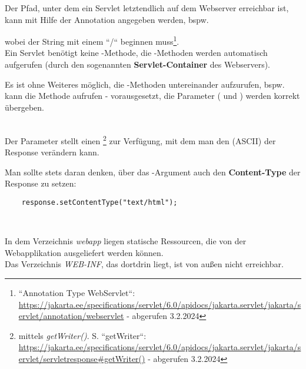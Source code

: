 \noindent
Der Pfad, unter dem ein Servlet letztendlich auf dem Webserver erreichbar ist, kann mit Hilfe der Annotation  angegeben werden, bspw. \begin{center}\end{center} wobei der String mit einem ``/`` beginnen muss\footnote{
    ``Annotation Type WebServlet``: \url{https://jakarta.ee/specifications/servlet/6.0/apidocs/jakarta.servlet/jakarta/servlet/annotation/webservlet} - abgerufen 3.2.2024
}.\\

\noindent
Ein Servlet benötigt keine -Methode, die -Methoden werden automatisch aufgerufen (durch den sogenannten \textbf{Servlet-Container} des Webservers).

\begin{tcolorbox}[enlarge top by=0.5cm,enlarge bottom by=0.5cm]
    Es ist ohne Weiteres möglich, die -Methoden untereinander aufzurufen, bspw. kann  die Methode  aufrufen - vorausgesetzt, die Parameter ( und ) werden korrekt übergeben.
\end{tcolorbox}\\

\noindent
Der Parameter  stellt einen \footnote{
mittels \textit{getWriter()}. S. ``getWriter``: \url{https://jakarta.ee/specifications/servlet/6.0/apidocs/jakarta.servlet/jakarta/servlet/servletresponse#getWriter()} - abgerufen 3.2.2024
} zur Verfügung, mit dem man den  (ASCII) der Response verändern kann.

\begin{tcolorbox}[enlarge top by=0.5cm,enlarge bottom by=0.5cm]
    Man sollte stets daran denken, über das -Argument auch den \textbf{Content-Type} der Response zu setzen:
    \begin{verbatim}
    response.setContentType("text/html");
    \end{verbatim}\\
\end{tcolorbox}

\noindent
In dem Verzeichnis \textit{webapp} liegen statische Ressourcen, die von der Webapplikation ausgeliefert werden können.\\
Das Verzeichnis \textit{WEB-INF}, das dortdrin liegt, ist von außen nicht erreichbar.\\


